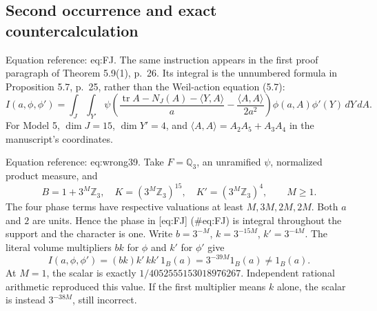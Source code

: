\documentclass[10pt]{article}
\begin{document}
\subsection*{Second occurrence and exact countercalculation}
Equation reference: eq:FJ. The same instruction appears in the first proof paragraph of Theorem 5.9(1), p. 26. Its integral is the unnumbered formula in Proposition 5.7, p. 25, rather than the Weil-action equation (5.7): \[
 I(a,\phi,\phi')=\int_J\int_{Y'}
 \psi\!\left(\frac{\operatorname{tr}A-N_J(A)-\langle Y,A\rangle}{a}
 -\frac{\langle A,A\rangle}{2a^2}\right)
 \phi(a,A)\phi'(Y)\,dY\,dA .\] For Model 5, \(\dim J=15\), \(\dim Y'=4\), and \(\langle A,A\rangle=A_2A_5+A_3A_4\) in the manuscript’s coordinates.\par
Equation reference: eq:wrong39. Take \(F=\mathbb Q_3\), an unramified \(\psi\), normalized product measure, and \[B=1+3^M\mathbb Z_3,\quad K=(3^M\mathbb Z_3)^{15},\quad
 K'=(3^M\mathbb Z_3)^4,\qquad M\ge1.\] The four phase terms have respective valuations at least \(M,3M,2M,2M\). Both \(a\) and \(2\) are units. Hence the phase in [eq:FJ] (\#eq:FJ) is integral throughout the support and the character is one. Write \(b=3^{-M}\), \(k=3^{-15M}\), \(k'=3^{-4M}\). The literal volume multipliers \(bk\) for \(\phi\) and \(k'\) for \(\phi'\) give \[
 I(a,\phi,\phi')=(bk)k'\,kk'\,1_B(a)
 =3^{-39M}1_B(a)\ne1_B(a).\] At \(M=1\), the scalar is exactly \(1/4052555153018976267\). Independent rational arithmetic reproduced this value. If the first multiplier means \(k\) alone, the scalar is instead \(3^{-38M}\), still incorrect.\par
\end{document}
